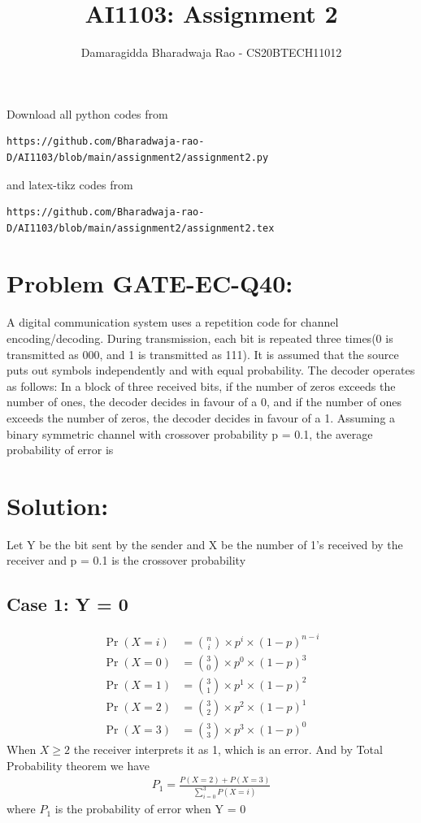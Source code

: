 \documentclass[journal,12pt,twocolumn]{IEEEtran}
\begin{document}
     \def\rightbox#1{\makebox[0in][r]{#1}}
     \def\centbox#1{\makebox[0in]{#1}}
     \def\topbox#1{\raisebox{-\baselineskip}[0in][0in]{#1}}
     \def\midbox#1{\raisebox{-0.5\baselineskip}[0in][0in]{#1}}
\vspace{3cm}
\title{AI1103: Assignment 2}
\author{Damaragidda Bharadwaja Rao - CS20BTECH11012}
\maketitle
\newpage
\bigskip
\renewcommand{\thefigure}{\theenumi}
\renewcommand{\thetable}{\theenumi}
Download all python codes from 
\begin{lstlisting}
https://github.com/Bharadwaja-rao-D/AI1103/blob/main/assignment2/assignment2.py
\end{lstlisting}
%
and latex-tikz codes from 
%
\begin{lstlisting}
https://github.com/Bharadwaja-rao-D/AI1103/blob/main/assignment2/assignment2.tex
\end{lstlisting}
\section*{Problem GATE-EC-Q40: }
A digital communication system uses a
repetition code for channel
encoding/decoding. During transmission, each
bit is repeated three times(0 is transmitted as
000, and 1 is transmitted as 111). It is
assumed that the source puts out symbols
independently and with equal probability. The
decoder operates as follows: In a block of three
received bits, if the number of zeros exceeds the
number of ones, the decoder decides in favour of
a 0, and if the number of ones exceeds the
number of zeros, the decoder decides in favour
of a 1. Assuming a binary symmetric channel
with crossover probability p = 0.1, the average
probability of error is
\section*{Solution:}
Let Y be the bit sent by the sender and X be the number of 1's received by the receiver and p = 0.1 is the crossover probability
\subsection*{Case 1: Y = 0}

\begin{align}
    \Pr(X = i) &= \binom{n}{i}\times p^i\times (1-p)^{n-i}\\
\Pr(X = 0) &= \binom{3}{0}\times p^0\times (1-p)^{3}\\
\Pr(X = 1) &= \binom{3}{1}\times p^1\times (1-p)^{2}\\
\Pr(X = 2) &= \binom{3}{2}\times p^2\times (1-p)^{1}\\
\Pr(X = 3) &= \binom{3}{3}\times p^3\times (1-p)^{0}
\end{align}
When $X \geq 2 $ the receiver interprets it as 1, which is an error. And by Total Probability theorem we have\\
\begin{align}
P_1 = \frac{P(X = 2) + P(X = 3)}{\sum_{i=0}^3P(X = i)}
\end{align}
where $P_1$ is the probability of error when Y = 0
\end{document}
